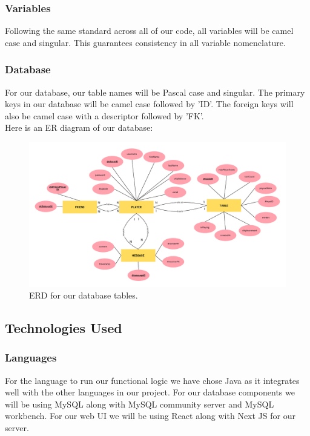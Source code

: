 \subsubsection{Variables}
Following the same standard across all of our code, all variables will be camel case and singular. This guarantees consistency in all variable nomenclature. 

\subsubsection{Database}
For our database, our table names will be Pascal case and singular. The primary keys in our database will be camel case followed by 'ID'. The foreign keys will also be camel case with a descriptor followed by 'FK'.\\

Here is an ER diagram of our database: 

\begin{figure}[hbt!]
    \centering
    \includegraphics[width=1.0\linewidth]{figures/SE Database ERD.pdf}
    \caption{ERD for our database tables.}
    \label{fig:ERD}
\end{figure} 

\pagebreak

\subsection{Technologies Used}

\subsubsection{Languages}
For the language to run our functional logic we have chose Java as it integrates well with the other languages in our project. For our database components we will be using MySQL along with MySQL community server and MySQL workbench. For our web UI we will be using React along with Next JS for our server.

